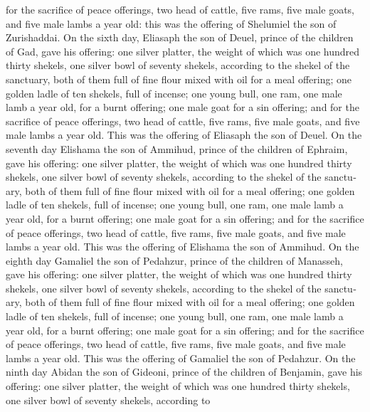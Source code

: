 \begin{paracol}{2}
\begin{otherlanguage}{english}
for the sacrifice of peace offerings, two head of cattle, five rams,
five male goats, and five male lambs a year old: this was the offering
of Shelumiel the son of Zurishaddai.  On the sixth day,
Eliasaph the son of Deuel, prince of the children of Gad,
 gave his offering: one silver platter, the weight of
which was one hundred thirty shekels, one silver bowl of seventy
shekels, according to the shekel of the sanctuary, both of them full of
fine flour mixed with oil for a meal offering;  one
golden ladle of ten shekels, full of incense;  one young
bull, one ram, one male lamb a year old, for a burnt offering;
 one male goat for a sin offering;  and
for the sacrifice of peace offerings, two head of cattle, five rams,
five male goats, and five male lambs a year old. This was the offering
of Eliasaph the son of Deuel.  On the seventh day
Elishama the son of Ammihud, prince of the children of Ephraim,
 gave his offering: one silver platter, the weight of
which was one hundred thirty shekels, one silver bowl of seventy
shekels, according to the shekel of the sanctuary, both of them full of
fine flour mixed with oil for a meal offering;  one
golden ladle of ten shekels, full of incense;  one young
bull, one ram, one male lamb a year old, for a burnt offering;
 one male goat for a sin offering;  and
for the sacrifice of peace offerings, two head of cattle, five rams,
five male goats, and five male lambs a year old. This was the offering
of Elishama the son of Ammihud.  On the eighth day
Gamaliel the son of Pedahzur, prince of the children of Manasseh,
 gave his offering: one silver platter, the weight of
which was one hundred thirty shekels, one silver bowl of seventy
shekels, according to the shekel of the sanctuary, both of them full of
fine flour mixed with oil for a meal offering;  one
golden ladle of ten shekels, full of incense;  one young
bull, one ram, one male lamb a year old, for a burnt offering;
 one male goat for a sin offering;  and
for the sacrifice of peace offerings, two head of cattle, five rams,
five male goats, and five male lambs a year old. This was the offering
of Gamaliel the son of Pedahzur.  On the ninth day Abidan
the son of Gideoni, prince of the children of Benjamin, 
gave his offering: one silver platter, the weight of which was one
hundred thirty shekels, one silver bowl of seventy shekels, according to

\end{otherlanguage}
\end{paracol}
